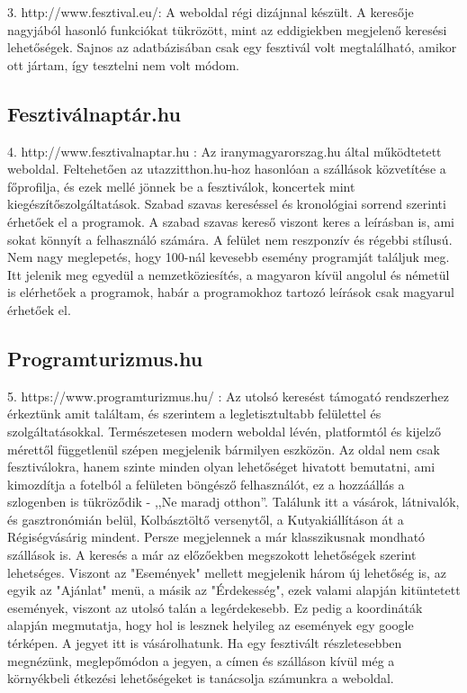 3. http://www.fesztival.eu/: A weboldal régi dizájnnal készült. A keresője nagyjából hasonló funkciókat tükrözött, mint az eddigiekben megjelenő keresési lehetőségek. Sajnos az adatbázisában csak egy fesztivál volt megtalálható, amikor ott jártam, így tesztelni nem volt módom.

\subsection{Fesztiválnaptár.hu}

4. http://www.fesztivalnaptar.hu : Az iranymagyarorszag.hu által működtetett weboldal. Feltehetően az utazzitthon.hu-hoz hasonlóan a szállások közvetítése a főprofilja, és ezek mellé jönnek be a fesztiválok, koncertek mint kiegészítőszolgáltatások. Szabad szavas kereséssel és kronológiai sorrend szerinti érhetőek el a programok. A szabad szavas kereső viszont keres a leírásban is, ami sokat könnyít a felhasználó számára. A felület nem reszponzív és régebbi stílusú. Nem nagy meglepetés, hogy 100-nál kevesebb esemény programját találjuk meg. Itt jelenik meg egyedül a nemzetköziesítés, a magyaron kívül angolul és németül is elérhetőek a programok, habár a programokhoz tartozó leírások csak magyarul érhetőek el.

\subsection{Programturizmus.hu}

5. https://www.programturizmus.hu/ : Az utolsó keresést támogató rendszerhez érkeztünk amit találtam, és szerintem a legletisztultabb felülettel és szolgáltatásokkal. Természetesen modern weboldal lévén, platformtól és kijelző mérettől függetlenül szépen megjelenik bármilyen eszközön. Az oldal nem csak fesztiválokra, hanem szinte minden olyan lehetőséget hivatott bemutatni, ami kimozdítja a fotelból a felületen böngésző felhasználót, ez a hozzáállás a szlogenben is tükröződik - ,,Ne maradj otthon''. Találunk itt a vásárok, látnivalók, és gasztronómián belül, Kolbásztöltő versenytől, a Kutyakiállításon át a Régiségvásárig mindent. Persze megjelennek a már klasszikusnak mondható szállások is. A keresés a már az előzőekben megszokott lehetőségek szerint lehetséges. Viszont az "Események" mellett megjelenik három új lehetőség is, az egyik az "Ajánlat" menü, a másik az "Érdekesség", ezek valami alapján kitüntetett események, viszont az utolsó talán a legérdekesebb. Ez pedig a koordináták alapján megmutatja, hogy hol is lesznek helyileg az események egy google térképen. A jegyet itt is vásárolhatunk. Ha egy fesztivált részletesebben megnézünk, meglepőmódon a jegyen, a címen és szálláson kívül még a környékbeli étkezési lehetőségeket is tanácsolja számunkra a weboldal.

